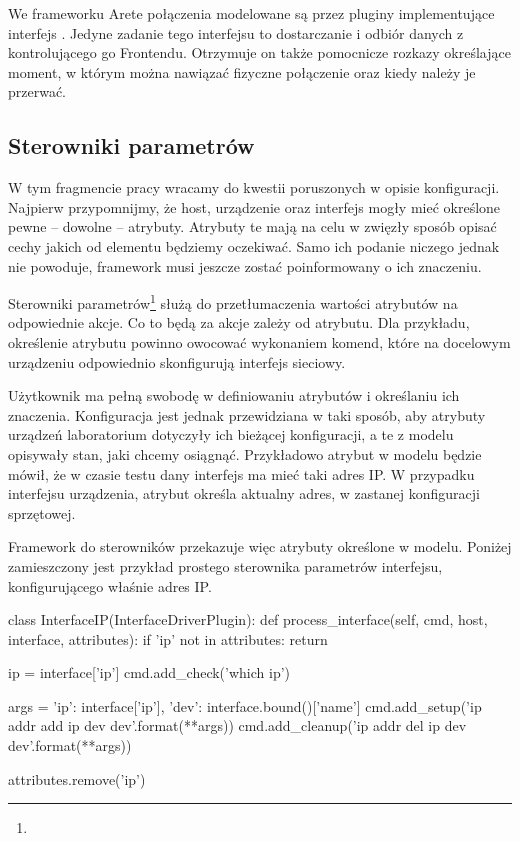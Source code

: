 \documentclass[00-praca-magisterska.tex]{subfiles}
\begin{document}
We frameworku Arete połączenia modelowane są przez pluginy implementujące
interfejs . Jedyne zadanie tego interfejsu to
dostarczanie i odbiór danych z kontrolującego go Frontendu. Otrzymuje on także
pomocnicze rozkazy określające moment, w którym można nawiązać fizyczne
połączenie oraz kiedy należy je przerwać.


\subsection{Sterowniki parametrów}

W tym fragmencie pracy wracamy do kwestii poruszonych w opisie konfiguracji.
Najpierw przypomnijmy, że host, urządzenie oraz interfejs mogły mieć określone
pewne -- dowolne -- atrybuty. Atrybuty te mają na celu w zwięzły sposób opisać
cechy jakich od elementu będziemy oczekiwać. Samo ich podanie niczego jednak nie
powoduje, framework musi jeszcze zostać poinformowany o ich znaczeniu.

Sterowniki parametrów\footnote{} służą do przetłumaczenia
wartości atrybutów na odpowiednie akcje. Co to będą za akcje zależy od atrybutu.
Dla przykładu, określenie atrybutu  powinno owocować wykonaniem komend,
które na docelowym urządzeniu odpowiednio skonfigurują interfejs sieciowy.

Użytkownik ma pełną swobodę w definiowaniu atrybutów i określaniu ich
znaczenia. Konfiguracja jest jednak przewidziana w taki sposób, aby atrybuty
urządzeń laboratorium dotyczyły ich bieżącej konfiguracji, a te z modelu
opisywały stan, jaki chcemy osiągnąć. Przykładowo atrybut  w modelu
będzie mówił, że w czasie testu dany interfejs ma mieć taki adres IP. W
przypadku interfejsu urządzenia, atrybut  określa aktualny adres, w
zastanej konfiguracji sprzętowej.

Framework do sterowników przekazuje więc atrybuty określone w modelu. Poniżej
zamieszczony jest przykład prostego sterownika parametrów interfejsu,
konfigurującego właśnie adres IP.

\begin{pythoncode}
class InterfaceIP(InterfaceDriverPlugin):
    def process_interface(self, cmd, host, interface, attributes):
        if 'ip' not in attributes:
            return

        ip = interface['ip']
        cmd.add_check('which ip')

        args = {'ip': interface['ip'],
                'dev': interface.bound()['name']}
        cmd.add_setup('ip addr add {ip} dev {dev}'.format(**args))
        cmd.add_cleanup('ip addr del {ip} dev {dev}'.format(**args))

        attributes.remove('ip')

\end{pythoncode}
\end{document}
